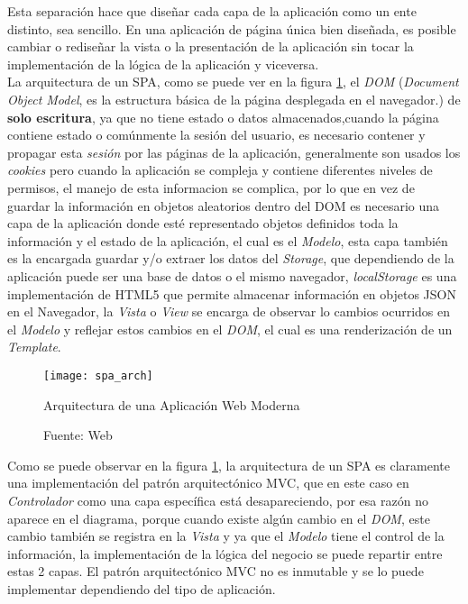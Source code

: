 Esta separación hace que diseñar cada capa de la aplicación como un ente distinto, sea sencillo. En una aplicación de página única bien diseñada, es posible cambiar o rediseñar la vista o la presentación de la aplicación sin tocar la implementación de la lógica de la aplicación y viceversa.\\

La arquitectura de un SPA, como se puede ver en la figura \ref{fig:spa_arch}, el \emph{DOM} (\emph{Document Object Model}, es la estructura básica de la página desplegada en el navegador.) de \textbf{solo escritura}, ya que no tiene estado o datos almacenados,cuando la página contiene estado o comúnmente la sesión del usuario, es necesario contener y propagar esta \emph{sesión} por las páginas de la aplicación, generalmente son usados los \emph{cookies} pero cuando la aplicación se compleja y contiene diferentes niveles de permisos, el manejo de esta informacion se complica, por lo que en vez de guardar la información en objetos aleatorios dentro del DOM es necesario una capa de la aplicación donde esté representado objetos definidos toda la información y el estado de la aplicación, el cual es el \emph{Modelo}, esta capa también es la encargada guardar y/o extraer los datos del \emph{Storage}, que dependiendo de la aplicación puede ser una base de datos o el mismo navegador, \emph{localStorage} es una implementación de HTML5 que permite almacenar información en objetos JSON en el Navegador, la \emph{Vista} o \emph{View} se encarga de observar lo cambios ocurridos en el \emph{Modelo} y reflejar estos cambios en el \emph{DOM}, el cual es una renderización de un \emph{Template}.\\

\begin{figure}[H]
  \begin{center}
    \texttt{[image: spa\_arch]}
    \caption[SPA Architecture ]{Arquitectura de una Aplicación Web Moderna}
    \label{fig:spa_arch}
    \caption*{Fuente: Web \cite{xp_addison} }
  \end{center}
\end{figure}


Como se puede observar en la figura \ref{fig:spa_arch}, la arquitectura de un SPA es claramente  una implementación del patrón arquitectónico MVC, que en este caso en \emph{Controlador} como una capa específica está desapareciendo, por esa razón no aparece en el diagrama, porque cuando existe algún cambio en el \emph{DOM}, este cambio también se registra en la \emph{Vista} y ya que el \emph{Modelo} tiene el control de la información, la implementación de la lógica del negocio se puede repartir entre estas 2 capas. El patrón arquitectónico MVC no es inmutable y se lo puede implementar dependiendo del tipo de aplicación.\\

